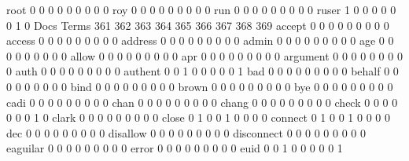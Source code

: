 \documentclass[compress,8pt]{beamer}
\begin{document}
\begin{frame}
\begin{Schunk}
  root                                       0   0   0   0   0   0   0   0   0
  roy                                        0   0   0   0   0   0   0   0   0
  run                                        0   0   0   0   0   0   0   0   0
  ruser                                      1   0   0   0   0   0   0   1   0
                                          Docs
Terms                                      361 362 363 364 365 366 367 368 369
  accept                                     0   0   0   0   0   0   0   0   0
  access                                     0   0   0   0   0   0   0   0   0
  address                                    0   0   0   0   0   0   0   0   0
  admin                                      0   0   0   0   0   0   0   0   0
  age                                        0   0   0   0   0   0   0   0   0
  allow                                      0   0   0   0   0   0   0   0   0
  apr                                        0   0   0   0   0   0   0   0   0
  argument                                   0   0   0   0   0   0   0   0   0
  auth                                       0   0   0   0   0   0   0   0   0
  authent                                    0   0   1   0   0   0   0   0   1
  bad                                        0   0   0   0   0   0   0   0   0
  behalf                                     0   0   0   0   0   0   0   0   0
  bind                                       0   0   0   0   0   0   0   0   0
  brown                                      0   0   0   0   0   0   0   0   0
  bye                                        0   0   0   0   0   0   0   0   0
  cadi                                       0   0   0   0   0   0   0   0   0
  chan                                       0   0   0   0   0   0   0   0   0
  chang                                      0   0   0   0   0   0   0   0   0
  check                                      0   0   0   0   0   0   0   1   0
  clark                                      0   0   0   0   0   0   0   0   0
  close                                      0   1   0   0   1   0   0   0   0
  connect                                    0   1   0   0   1   0   0   0   0
  dec                                        0   0   0   0   0   0   0   0   0
  disallow                                   0   0   0   0   0   0   0   0   0
  disconnect                                 0   0   0   0   0   0   0   0   0
  eaguilar                                   0   0   0   0   0   0   0   0   0
  error                                      0   0   0   0   0   0   0   0   0
  euid                                       0   0   1   0   0   0   0   0   1

\end{Schunk}
\end{frame}
\end{document}
